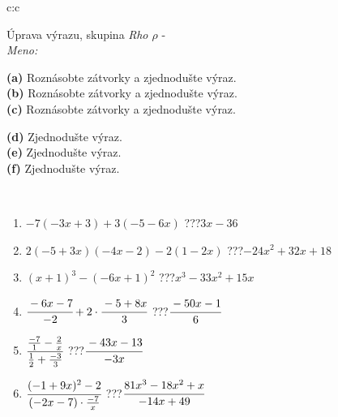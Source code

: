 \documentclass[10pt]{report}
\begin{document}
\newpage
\thispagestyle{empty}
\begin{tabular}{c:c}
\begin{minipage}[c][104.5mm][t]{0.5\linewidth}
\begin{center}
\vspace{7mm}
{\huge Úprava výrazu, skupina \textit{Rho $\rho$} -}\\[5mm]
\textit{Meno:}\phantom{xxxxxxxxxxxxxxxxxxxxxxxxxxxxxxxxxxxxxxxxxxxxxxxxxxxxxxxxxxxxxxxxx}\\[5mm]
\begin{minipage}{0.95\linewidth}
\begin{center}
{\small \begin{minipage}{0.6\textwidth}
\textbf{(a)} Roznásobte zátvorky a zjednodušte výraz. \\[1mm]
\textbf{(b)} Roznásobte zátvorky a zjednodušte výraz. \\[1mm]
\textbf{(c)} Roznásobte zátvorky a zjednodušte výraz.
\end{minipage} \begin{minipage}{0.39\textwidth}
\textbf{(d)} Zjednodušte výraz. \\[1mm]
\textbf{(e)} Zjednodušte výraz. \\[1mm]
\textbf{(f)} Zjednodušte výraz.
\end{minipage}
}
\end{center}
\end{minipage}
\\[4mm]
\begin{minipage}{0.79\linewidth}
\begin{center}
\begin{varwidth}{\linewidth}
\begin{enumerate}
\normalsize
\item $-7(-3x+3)+3(-5-6x)$\quad \dotfill\; ???\;\dotfill \quad $3x-36$
\item $2(-5+3x)(-4x-2)-2(1-2x)$\quad \dotfill\; ???\;\dotfill \quad $-24x^2+32x+18$
\item $(x+1)^3-(-6x+1)^2$\quad \dotfill\; ???\;\dotfill \quad $x^3-33x^2+15x$
\item $\cfrac{-6x-7}{-2}+2\cdot\cfrac{-5+8x}{3}$\quad \dotfill\; ???\;\dotfill \quad $\cfrac{-50x-1}{6}$
\item $\cfrac{\frac{-7}{1}-\frac{2}{x}}{\frac{1}{2}+\frac{-3}{3}}$\quad \dotfill\; ???\;\dotfill \quad $\cfrac{-43x-13}{-3x}$
\item $\cfrac{(-1+9x)^2-2}{(-2x-7)\cdot\frac{-7}{x}}$\quad \dotfill\; ???\;\dotfill \quad $\cfrac{81x^3-18x^2+x}{-14x+49}$

\end{enumerate}
\end{varwidth}
\end{center}
\end{minipage}
\end{center}
\end{minipage}
\end{tabular}
\end{document}
